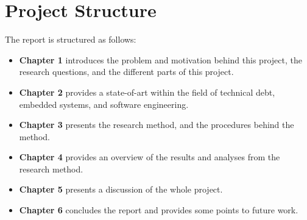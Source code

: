 \section{Project Structure}
The report is structured as follows:
\begin{itemize}
	\item \textbf{Chapter 1} introduces the problem and motivation behind this project, the research questions, and the different parts of this project.
	\item \textbf{Chapter 2} provides a state-of-art within the field of technical debt, embedded systems, and software engineering.
	\item \textbf{Chapter 3} presents the research method, and the procedures behind the method.
	\item \textbf{Chapter 4} provides an overview of the results and analyses from the research method.
	\item \textbf{Chapter 5} presents a discussion of the whole project.
	\item \textbf{Chapter 6} concludes the report and provides some points to future work. 
\end{itemize}

